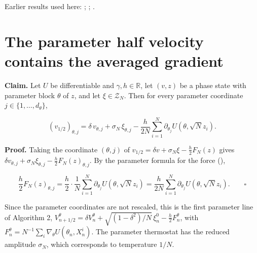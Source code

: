 \documentclass[11pt,a4paper]{article}
\begin{document}
Earlier results used here: \cite[Section~3.1.1]{LangevinLean2026IPLA}; \cite[Section~3.20.1]{LangevinLean2026Kinetic}; \cite[Section~3.20.5]{LangevinLean2026Kinetic}.

\section{\texorpdfstring{The parameter half velocity contains the averaged gradient}{The parameter half velocity contains the averaged gradient}}


\textbf{Claim.} Let \(U\) be differentiable and \(\gamma,h\in\mathbb R\), let \((v,z)\) be a phase state with parameter block \(\theta\) of \(z\), and let \(\xi\in\mathcal Z_N\). Then for every parameter coordinate \(j\in\{1,\dots,d_\theta\}\),


\[(v_{1/2})_{\theta,j}=\delta\,v_{\theta,j}+\sigma_N\,\xi_{\theta,j}-\frac h{2N}\sum_{i=1}^N\partial_{\theta_j}U(\theta,\sqrt Nz_i).\]


\textbf{Proof.} Taking the coordinate \((\theta,j)\) of \(v_{1/2}=\delta v+\sigma_N\xi-\frac h2F_N(z)\) gives \(\delta v_{\theta,j}+\sigma_N\xi_{\theta,j}-\frac h2F_N(z)_{\theta,j}\). By the parameter formula for the force (\cite[Section~3.1.4]{LangevinLean2026KIPLMC}),


\[\frac h2F_N(z)_{\theta,j}=\frac h2\cdot\frac1N\sum_{i=1}^N\partial_{\theta_j}U(\theta,\sqrt Nz_i)=\frac h{2N}\sum_{i=1}^N\partial_{\theta_j}U(\theta,\sqrt Nz_i).\qquad\square\]


Since the parameter coordinates are not rescaled, this is the first parameter line of Algorithm 2, \(V^\theta_{n+1/2}=\delta V^\theta_n+\sqrt{(1-\delta^2)/N}\,\xi^0_n-\frac h2F^\theta_n\), with \(F^\theta_n=N^{-1}\sum_i\nabla_\theta U(\theta_n,X^i_n)\). The parameter thermostat has the reduced amplitude \(\sigma_N\), which corresponds to temperature \(1/N\).
\end{document}
